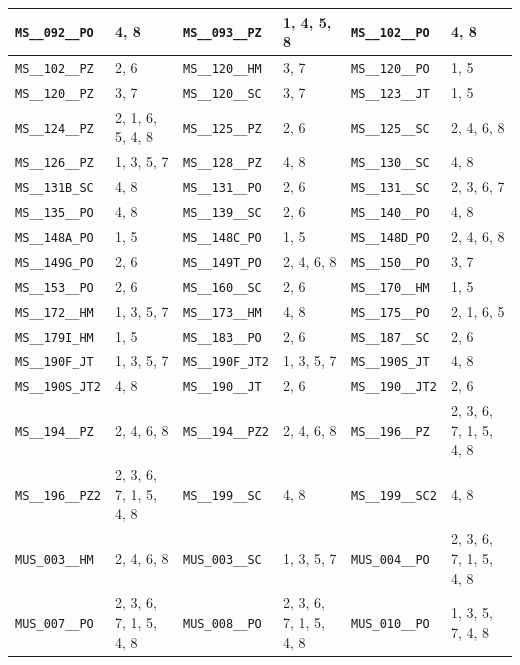 \begin{longtable}{|l|l||l|l||l|l|}
    \verb|MS__092__PO| & 4, 8 & \verb|MS__093__PZ| & 1, 4, 5, 8 & \verb|MS__102__PO| & 4, 8\\\hline
    \verb|MS__102__PZ| & 2, 6 & \verb|MS__120__HM| & 3, 7 & \verb|MS__120__PO| & 1, 5\\\hline
    \verb|MS__120__PZ| & 3, 7 & \verb|MS__120__SC| & 3, 7 & \verb|MS__123__JT| & 1, 5\\\hline
    \verb|MS__124__PZ| & 2, 1, 6, 5, 4, 8 & \verb|MS__125__PZ| & 2, 6 & \verb|MS__125__SC| & 2, 4, 6, 8\\\hline
    \verb|MS__126__PZ| & 1, 3, 5, 7 & \verb|MS__128__PZ| & 4, 8 & \verb|MS__130__SC| & 4, 8\\\hline
    \verb|MS__131B_SC| & 4, 8 & \verb|MS__131__PO| & 2, 6 & \verb|MS__131__SC| & 2, 3, 6, 7\\\hline
    \verb|MS__135__PO| & 4, 8 & \verb|MS__139__SC| & 2, 6 & \verb|MS__140__PO| & 4, 8\\\hline
    \verb|MS__148A_PO| & 1, 5 & \verb|MS__148C_PO| & 1, 5 & \verb|MS__148D_PO| & 2, 4, 6, 8\\\hline
    \verb|MS__149G_PO| & 2, 6 & \verb|MS__149T_PO| & 2, 4, 6, 8 & \verb|MS__150__PO| & 3, 7\\\hline
    \verb|MS__153__PO| & 2, 6 & \verb|MS__160__SC| & 2, 6 & \verb|MS__170__HM| & 1, 5\\\hline
    \verb|MS__172__HM| & 1, 3, 5, 7 & \verb|MS__173__HM| & 4, 8 & \verb|MS__175__PO| & 2, 1, 6, 5\\\hline
    \verb|MS__179I_HM| & 1, 5 & \verb|MS__183__PO| & 2, 6 & \verb|MS__187__SC| & 2, 6\\\hline
    \verb|MS__190F_JT| & 1, 3, 5, 7 & \verb|MS__190F_JT2| & 1, 3, 5, 7 & \verb|MS__190S_JT| & 4, 8\\\hline
    \verb|MS__190S_JT2| & 4, 8 & \verb|MS__190__JT| & 2, 6 & \verb|MS__190__JT2| & 2, 6\\\hline
    \verb|MS__194__PZ| & 2, 4, 6, 8 & \verb|MS__194__PZ2| & 2, 4, 6, 8 & \verb|MS__196__PZ| & 2, 3, 6, 7, 1, 5, 4, 8\\\hline
    \verb|MS__196__PZ2| & 2, 3, 6, 7, 1, 5, 4, 8 & \verb|MS__199__SC| & 4, 8 & \verb|MS__199__SC2| & 4, 8\\\hline
    \verb|MUS_003__HM| & 2, 4, 6, 8 & \verb|MUS_003__SC| & 1, 3, 5, 7 & \verb|MUS_004__PO| & 2, 3, 6, 7, 1, 5, 4, 8\\\hline
    \verb|MUS_007__PO| & 2, 3, 6, 7, 1, 5, 4, 8 & \verb|MUS_008__PO| & 2, 3, 6, 7, 1, 5, 4, 8 & \verb|MUS_010__PO| & 1, 3, 5, 7, 4, 8\\\hline

\end{longtable}
